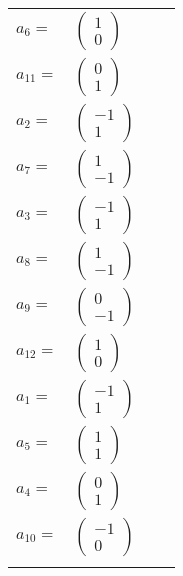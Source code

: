 \documentclass[1p]{elsarticle_modified}
\theoremstyle{definition}
\begin{document}
\begin{tabular}{m{7pt} m{180pt} m{7pt} m{180pt} }
\flushright $a_{6}=$&$\begin{pmatrix}1\\0\end{pmatrix}$ \\
\flushright $a_{11}=$&$\begin{pmatrix}0\\1\end{pmatrix}$ \\
\flushright $a_{2}=$&$\begin{pmatrix}-1\\1\end{pmatrix}$ \\
\flushright $a_{7}=$&$\begin{pmatrix}1\\-1\end{pmatrix}$ \\
\flushright $a_{3}=$&$\begin{pmatrix}-1\\1\end{pmatrix}$ \\
\flushright $a_{8}=$&$\begin{pmatrix}1\\-1\end{pmatrix}$ \\
\flushright $a_{9}=$&$\begin{pmatrix}0\\-1\end{pmatrix}$ \\
\flushright $a_{12}=$&$\begin{pmatrix}1\\0\end{pmatrix}$ \\
\flushright $a_{1}=$&$\begin{pmatrix}-1\\1\end{pmatrix}$ \\
\flushright $a_{5}=$&$\begin{pmatrix}1\\1\end{pmatrix}$ \\
\flushright $a_{4}=$&$\begin{pmatrix}0\\1\end{pmatrix}$ \\
\flushright $a_{10}=$&$\begin{pmatrix}-1\\0\end{pmatrix}$\\&\end{tabular}
\end{document}
